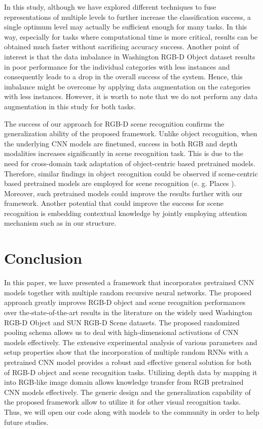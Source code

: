 \documentclass[10pt,journal,compsoc]{IEEEtran}
\begin{document}
In this study, although we have explored different techniques to fuse representations of multiple levels to further increase the classification success, a single optimum level may actually be sufficient enough for many tasks. In this way, especially for tasks where computational time is more critical, results can be obtained much faster without sacrificing accuracy success. Another point of interest is that the data imbalance in Washington RGB-D Object dataset results in poor performance for the individual categories with less instances and consequently leads to a drop in the overall success of the system. Hence, this imbalance might be overcome by applying data augmentation on the categories with less instances. However, it is worth to note that we do not perform any data augmentation in this study for both tasks.

The success of our approach for RGB-D scene recognition confirms the generalization ability of the proposed framework. Unlike object recognition, when the underlying CNN models are finetuned, success in both RGB and depth modalities increases significantly in scene recognition task. This is due to the need for cross-domain task adaptation of object-centric based pretrained models. Therefore, similar findings in object recognition could be observed if scene-centric based pretrained models are employed for scene recognition (e. g. Places \cite{Zhou_NIPS_2014}). Moreover, such pretrained models could improve the results further with our framework. Another potential that could improve the success for scene recognition is embedding contextual knowledge by jointly employing attention mechanism such as \cite{Fukui_2019_CVPR} in our structure.

 


\section{Conclusion}
\label{sec:conclusion}
In this paper, we have presented a framework that incorporates pretrained CNN models together with multiple random recursive neural networks. The proposed approach greatly improves RGB-D object and scene recognition performances over the-state-of-the-art results in the literature on the widely used Washington RGB-D Object and SUN RGB-D Scene datasets. The proposed randomized pooling schema allows us to deal with high-dimensional activations of CNN models effectively. The extensive experimental analysis of various parameters and setup properties show that the incorporation of multiple random RNNs with a pretrained CNN model provides a robust and effective general solution for both of RGB-D object and scene recognition tasks. Utilizing depth data by mapping it into RGB-like image domain allows knowledge transfer from RGB pretrained CNN models effectively. The generic design and the generalization capability of the proposed framework allow to utilize it for other visual recognition tasks. Thus, we will open our code along with models to the community in order to help future studies. 
\end{document}
